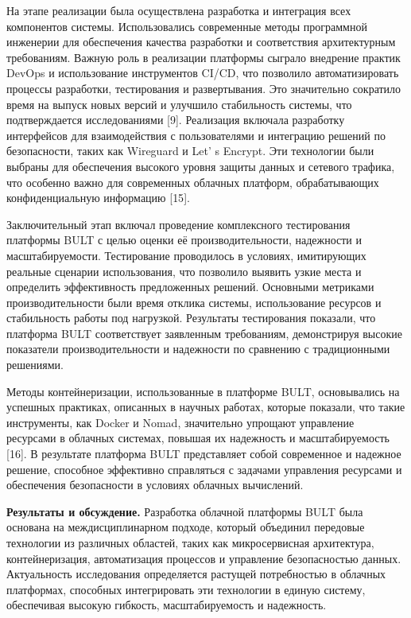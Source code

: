 \begin{multicols}{2}
На этапе реализации была осуществлена разработка и интеграция всех
компонентов системы. Использовались современные методы программной
инженерии для обеспечения качества разработки и соответствия
архитектурным требованиям. Важную роль в реализации платформы сыграло
внедрение практик DevOps и использование инструментов CI/CD, что
позволило автоматизировать процессы разработки, тестирования и
развертывания. Это значительно сократило время на выпуск новых версий и
улучшило стабильность системы, что подтверждается исследованиями
{[}9{]}. Реализация включала разработку интерфейсов для взаимодействия с
пользователями и интеграцию решений по безопасности, таких как Wireguard
и Let' s Encrypt. Эти технологии были выбраны для
обеспечения высокого уровня защиты данных и сетевого трафика, что
особенно важно для современных облачных платформ, обрабатывающих
конфиденциальную информацию {[}15{]}.

Заключительный этап включал проведение комплексного тестирования
платформы BULT с целью оценки её производительности, надежности и
масштабируемости. Тестирование проводилось в условиях, имитирующих
реальные сценарии использования, что позволило выявить узкие места и
определить эффективность предложенных решений. Основными метриками
производительности были время отклика системы, использование ресурсов и
стабильность работы под нагрузкой. Результаты тестирования показали, что
платформа BULT соответствует заявленным требованиям, демонстрируя
высокие показатели производительности и надежности по сравнению с
традиционными решениями.

Методы контейнеризации, использованные в платформе BULT, основывались на
успешных практиках, описанных в научных работах, которые показали, что
такие инструменты, как Docker и Nomad, значительно упрощают управление
ресурсами в облачных системах, повышая их надежность и масштабируемость
{[}16{]}. В результате платформа BULT представляет собой современное и
надежное решение, способное эффективно справляться с задачами управления
ресурсами и обеспечения безопасности в условиях облачных вычислений.

{\bfseries Результаты и обсуждение.} Разработка облачной платформы BULT
была основана на междисциплинарном подходе, который объединил передовые
технологии из различных областей, таких как микросервисная архитектура,
контейнеризация, автоматизация процессов и управление безопасностью
данных. Актуальность исследования определяется растущей потребностью в
облачных платформах, способных интегрировать эти технологии в единую
систему, обеспечивая высокую гибкость, масштабируемость и надежность.


\end{multicols}
